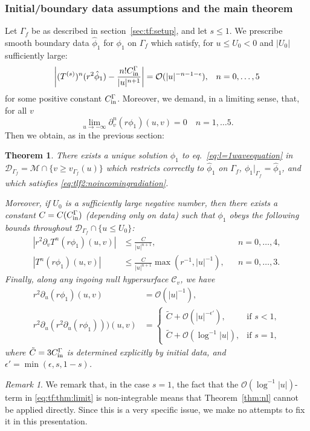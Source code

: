 \documentclass[11pt,english]{article}
\numberwithin{equation}{section}
\newtheorem{thm}{Theorem}[section]
\theoremstyle{remark}
\newtheorem{rem}{Remark}[section]
\theoremstyle{plain}
\theoremstyle{remark}
\newcommand{\pu}{\partial_u}
\newcommand{\pv}{\partial_v}
\renewcommand{\(}{\left(}
\renewcommand{\)}{\right)}
\newcommand{\pho}{(r\phi_1)}
\begin{document}
\subsubsection{Initial/boundary data assumptions and the main theorem}
Let $\Gamma_f$ be as described in section~\ref{sec:tf:setup}, and let $s\leq 1$. We prescribe smooth boundary data $\hat{\phi}_1$ for $\phi_1$ on $\Gamma_f$ which satisfy, for $u\leq U_0< 0$ and $|U_0|$ sufficiently large:
\begin{align}\label{eq:tlf2:boundarydata1}%
\left|(\te)^n(r^2\hat{\phi}_1)- \frac{n!\cin}{|u|^{n+1}}\right|=\mathcal{O}(|u|^{-n-1-\epsilon}),&&n=0,\dots,5
\end{align}
for some positive constant $C_{\mathrm{in}}^\Gamma$.
Moreover, we demand, in a limiting sense, that, for all $v$
\begin{equation}\label{eq:tlf2:noincomingradiation}
\lim_{u\to-\infty}\pv^n(r\phi_1)(u,v)=0\quad n=1,\dots 5.
\end{equation} 
Then we obtain, as in the previous section:
\begin{thm}\label{thm:tlf2}
There exists a unique solution $\phi_1$ to eq.\ \eqref{eq:l=1waveequation} in $\mathcal{D}_{\Gamma_f}=\mathcal{M}\cap\{v\geq v_{\Gamma_f}(u)\}$ which restricts correctly to $\hat{\phi}_1$ on $\Gamma_f$, $\phi_1|_{\Gamma_f}=\hat{\phi}_1$, and which satisfies \eqref{eq:tlf2:noincomingradiation}.


Moreover, if $U_0$ is a sufficiently large negative number, then there exists a constant $C=C(C_{\mathrm{in}}^\Gamma)$ (depending only on data) such that $\phi_1$ obeys the following bounds throughout $\mathcal{D}_{\Gamma_f}\cap\{u\leq U_0\}$:
\begin{align}
|r^2\pv T^n(r\phi_1)(u,v)|&\leq \frac{C}{|u|^{n+1}},&&n=0,\dots,4\label{eq:thm:tf1},\\
|T^n(r\phi_1)(u,v)|&\leq \frac{C}{|u|^{n+1}}\max\left(r^{-1},|u|^{-1}\right),&&n=0,\dots,3.\label{eq:thm:tf2}
\end{align}
Finally, along any ingoing null hypersurface $\mathcal{C}_v$, we have
\begin{align}
r^2\pu(r\phi_1)(u,v)&=\mathcal{O}(|u|^{-1})\label{eq:thm:tf3},\\
r^2\pu(r^2\pu\pho))(u,v)&=\begin{cases}	\tilde{C}+\mathcal{O}(|u|^{-\epsilon'}),& \text{if }s<1,\\
											\tilde{C}+\mathcal{O}(\log^{-1} |u|),&\text{if }s=1, \end{cases}\label{eq:tf:thm:limit}
\end{align}
where $\tilde{C}=3C_{\mathrm{in}}^\Gamma$ is determined explicitly by initial data, and $\epsilon'=\min(\epsilon, s, 1-s)$.
\end{thm}
\begin{rem}
We remark that, in the case $s=1$, the fact that the $\mathcal{O}(\log^{-1} |u|)$-term in \eqref{eq:tf:thm:limit} is non-integrable means that Theorem~\ref{thm:nl} cannot be applied directly. Since this is a very specific issue, we make no attempts to fix it in this presentation.
\end{rem}
\end{document}
